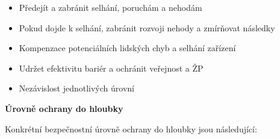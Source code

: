 \begin{itemize}
    \item Předejít a zabránit selhání, poruchám a nehodám

    \item Pokud dojde k selhání, zabránit rozvoji nehody a zmírňovat následky

    \item Kompenzace potenciálních lidských chyb a selhání zařízení

    \item Udržet efektivitu bariér a ochránit veřejnost a ŽP

    \item Nezávislost jednotlivých úrovní

\end{itemize}

\clearpage

\textbf{Úrovně ochrany do hloubky}

Konkrétní bezpečnostní úrovně ochrany do hloubky jsou následující:

